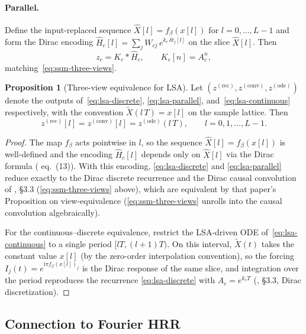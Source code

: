 \documentclass[11pt]{article}
\newcommand{\im}{\mathrm{i}}
\theoremstyle{definition}
\newtheorem{proposition}{Proposition}
\begin{document}
\paragraph{Parallel.}
Define the input-replaced sequence
\(
  \hat X[l] = f_\beta(x[l])
\)
for $l=0,\dots,L-1$ and form the Dirac encoding
$\hat H_c[l] = \sum_j W_{cj}\,e^{k_c\,\delta t_{j}[l]}$ on the slice
$\hat X[l]$. Then
\begin{equation}\label{eq:lsa-parallel}
  z_c = K_c * \hat H_c,
  \qquad K_c[n] = A_c^n,
\end{equation}
matching~\eqref{eq:ssm-three-views}.

\begin{proposition}[Three-view equivalence for LSA]\label{prop:lsa-equiv}
Let $(z^{(\mathrm{rec})}, z^{(\mathrm{conv})}, z^{(\mathrm{ode})})$
denote the outputs of~\eqref{eq:lsa-discrete}, \eqref{eq:lsa-parallel},
and~\eqref{eq:lsa-continuous} respectively, with the convention
$\tilde X(l\,T) = x[l]$ on the sample lattice. Then
\[
  z^{(\mathrm{rec})}[l] = z^{(\mathrm{conv})}[l]
  = z^{(\mathrm{ode})}(l\,T),
  \qquad l = 0, 1, \dots, L-1.
\]
\end{proposition}

\begin{proof}
The map $f_\beta$ acts pointwise in $l$, so the sequence
$\hat X[l] = f_\beta(x[l])$ is well-defined and the encoding
$\hat H_c[l]$ depends only on $\hat X[l]$ via the Dirac formula
(\cite{phasor-ssm-derivation} eq.~(13)). With this encoding,
\eqref{eq:lsa-discrete} and \eqref{eq:lsa-parallel} reduce exactly to
the Dirac discrete recurrence and the Dirac causal convolution of
\cite{phasor-ssm-derivation}, \S3.3 (\eqref{eq:ssm-three-views} above),
which are equivalent by that paper's Proposition on
view-equivalence (\eqref{eq:ssm-three-views} unrolls into the causal
convolution algebraically).

For the continuous--discrete equivalence, restrict the LSA-driven ODE
of~\eqref{eq:lsa-continuous} to a single period $[l T,(l+1)T)$. On this
interval, $\tilde X(t)$ takes the constant value $x[l]$ (by the
zero-order interpolation convention), so the forcing
$I_j(t) = e^{\im\pi f_\beta(x[l])_j}$ is the Dirac response of the same
slice, and integration over the period reproduces the recurrence
\eqref{eq:lsa-discrete} with $A_c = e^{k_c T}$ (\cite{phasor-ssm-derivation},
\S3.3, Dirac discretization).
\end{proof}

\subsection{Connection to Fourier HRR}
\end{document}
